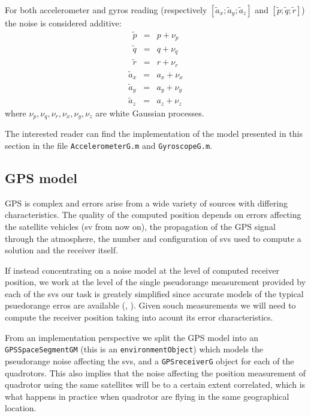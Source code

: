 \documentclass[a4paper,11pt]{report}
\begin{document}
For both accelerometer and gyros reading (respectively $[\tilde{a}_x;\tilde{a}_y;\tilde{a}_z]$ and $[\tilde{p};\tilde{q};\tilde{r}]$) the noise is considered additive:
\begin{eqnarray}
  \tilde{p} &=& p + \nu_p\\
  \tilde{q} &=& q + \nu_q\\
  \tilde{r} &=& r + \nu_r
\end{eqnarray}
\begin{eqnarray}
  \tilde{a}_x &=& a_x + \nu_x\\
  \tilde{a}_y &=& a_y + \nu_y\\
  \tilde{a}_z &=& a_z + \nu_z
\end{eqnarray}
where  $\nu_p,\nu_q,\nu_r,\nu_x,\nu_y,\nu_z$ are white Gaussian processes.

The interested reader can find the implementation of the model presented in this section in the file \texttt{AccelerometerG.m} and \texttt{GyroscopeG.m}.  

\subsection{GPS model}

GPS is complex and errors arise from a wide variety of sources with differing characteristics. The quality of the computed position depends on errors affecting the satellite vehicles (sv from now on), the propagation of the GPS signal through the atmosphere, the number and configuration of svs used to compute a solution and the receiver itself.

If instead concentrating on a noise model at the level of computed receiver position, we work at the level of the single pseudorange measurement provided by each of the svs our task is greately simplified since accurate models of the typical psuedorange erros are available (\cite{rankin1994anerror}, \cite{carlson2010mapping}). Given souch measurements we will need to compute the receiver position taking into acount its error characteristics.

From an implementation perspective we split the GPS model into an \texttt{GPSSpaceSegmentGM} (this is an \texttt{environmentObject}) which models the pseudorange noise affecting the svs, and a \texttt{GPSreceiverG} object for each of the quadrotors. This also implies that the noise affecting the position measurement of quadrotor using the same satellites will be to a certain extent correlated, which is what happens in practice when quadrotor are flying in the same geographical location.
  
\end{document}
